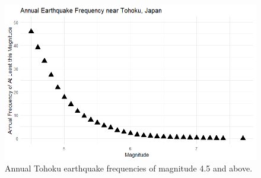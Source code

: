 \begin{figure}[H]
    \center
    \includegraphics[width=0.75\linewidth]{Figures/tohoku_standardscale.png}
    \caption{\footnotesize{Annual Tohoku earthquake frequencies of magnitude 4.5 and above.}}
    \label{tohoku_unfit}
\end{figure}




